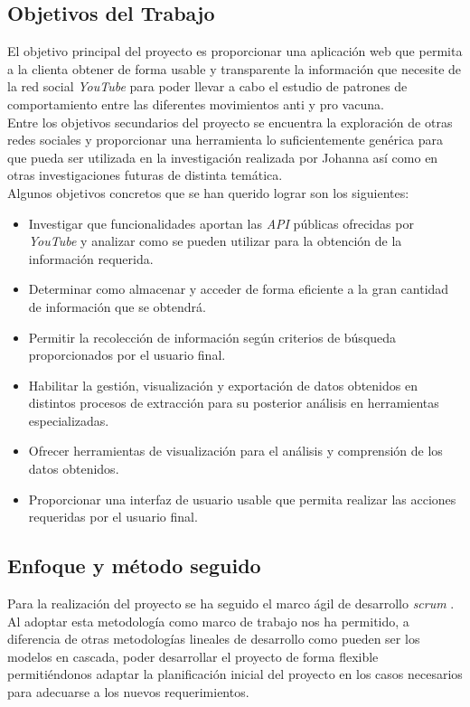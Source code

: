 \documentclass[11pt,a4paper]{article}
\begin{document}
\subsection{Objetivos del Trabajo}
El objetivo principal del proyecto es proporcionar una aplicación web que permita a la clienta obtener de forma usable y transparente la información que necesite de la red social \textit{YouTube} para poder llevar a cabo el estudio de patrones de comportamiento entre las diferentes movimientos anti y pro vacuna.
\\

Entre los objetivos secundarios del proyecto se encuentra la exploración de otras redes sociales y proporcionar una herramienta lo suficientemente genérica para que pueda ser utilizada en la investigación realizada por Johanna así como en otras investigaciones futuras de distinta temática.
\\

Algunos objetivos concretos que se han querido lograr son los siguientes: 
\begin{itemize}
\item Investigar que funcionalidades aportan las \textit{API} públicas ofrecidas por \textit{YouTube} y analizar como se pueden utilizar para la obtención de la información requerida.
\item Determinar como almacenar y acceder de forma eficiente a la gran cantidad de información que se obtendrá.
\item Permitir la recolección de información según criterios de búsqueda proporcionados por el usuario final.
\item Habilitar la gestión, visualización y exportación de datos obtenidos en distintos procesos de extracción para su posterior análisis en herramientas especializadas.
\item Ofrecer herramientas de visualización para el análisis y comprensión de los datos obtenidos.
\item Proporcionar una interfaz de usuario usable que permita realizar las acciones requeridas por el usuario final.
\end{itemize}
\medskip 

\subsection{Enfoque y método seguido}
Para la realización del proyecto se ha seguido el marco ágil de desarrollo \textit{scrum} \cite{8}. Al adoptar esta metodología como marco de trabajo nos ha permitido, a diferencia de otras metodologías lineales de desarrollo como pueden ser los modelos en cascada, poder desarrollar el proyecto de forma flexible permitiéndonos adaptar la planificación inicial del proyecto en los casos necesarios para adecuarse a los nuevos requerimientos.
\\
\end{document}
